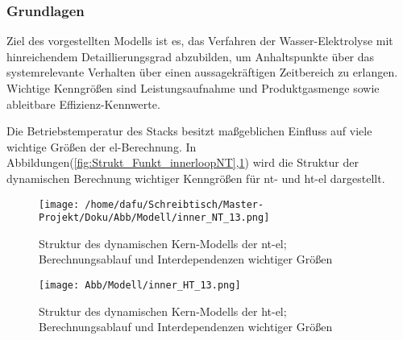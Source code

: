 \documentclass[onecolumn,10pt,titlepage]{article}
\begin{document}
\subsubsection{Grundlagen}
Ziel des vorgestellten Modells ist es, das Verfahren der Wasser-Elektrolyse mit hinreichendem Detaillierungsgrad abzubilden, um Anhaltspunkte über das systemrelevante Verhalten über einen aussagekräftigen Zeitbereich zu erlangen.\\ Wichtige Kenngrößen sind Leistungsaufnahme und Produktgasmenge sowie ableitbare Effizienz-Kennwerte.   

Die Betriebstemperatur des Stacks besitzt maßgeblichen Einfluss auf viele wichtige Größen der \gls{el}-Berechnung. 
In Abbildungen(\ref{fig:Strukt_Funkt_innerloopNT},\ref{fig:Strukt_Funkt_innerloopHT}) wird die Struktur der dynamischen Berechnung wichtiger Kenngrößen für \gls{nt}- und \gls{ht}-\gls{el} dargestellt.\\

%	

\begin{figure}[!tbp]
	\centering
	\begin{minipage}[t]{0.49\textwidth}
		\texttt{[image: /home/dafu/Schreibtisch/Master-Projekt/Doku/Abb/Modell/inner\_NT\_13.png]}
		
		\caption[Kern-Modell \gls{ht}-\gls{el}]{Struktur des dynamischen Kern-Modells der \gls{nt}-\gls{el}; Berechnungsablauf und Interdependenzen wichtiger Größen}
		\label{fig:Strukt_Funkt_innerloopNT} 
	\end{minipage}
	\hfill
	\begin{minipage}[t]{0.49\textwidth}
		\texttt{[image: Abb/Modell/inner\_HT\_13.png]}
		
		\caption[Kern-Modell \gls{ht}-\gls{el}]{Struktur des dynamischen Kern-Modells der \gls{ht}-\gls{el}; Berechnungsablauf und Interdependenzen wichtiger Größen}
		\label{fig:Strukt_Funkt_innerloopHT}  
	\end{minipage}
\end{figure}
\end{document}
